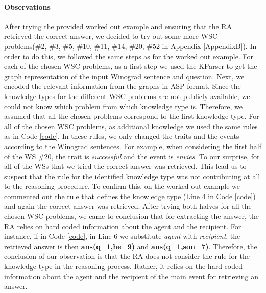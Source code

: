 \paragraph{Observations}
After trying the provided worked out example and ensuring that the RA retrieved the correct answer, we decided to try out some more WSC problems(\#2, \#3, \#5, \#10, \#11, \#14, \#20, \#52 in Appendix \ref{AppendixB}).
In order to do this, we followed the same steps as for the worked out example. For each of the chosen WSC problems, as a first step we used the KParser to get the graph representation of the input Winograd sentence and question. Next, we encoded the relevant information from the graphs in ASP format. Since the knowledge types for the different WSC problems are not publicly available, we could not know which problem from which knowledge type is. Therefore, we assumed that all the chosen problems correspond to the first knowledge type. For all of the chosen WSC problems, as additional knowledge we used the same rules as in Code \ref{code}. In these rules, we only changed the traits and the events according to the Winograd sentences. For example, when considering the first half of the WS \#20, the trait is \textit{successful} and the event is \textit{envies}. To our surprise, for all of the WSs that we tried the correct answer was retrieved. This lead us to suspect that the rule for the identified knowledge type was not contributing at all to the reasoning procedure. 
To confirm this, on the worked out example we commented out the rule that defines the knowledge type (Line 4 in Code \ref{code}) and again the correct answer was retrieved. After trying both halves for all the chosen WSC problems, we came to conclusion that for extracting the answer, the RA relies on hard coded information about the agent and the recipient. For instance, if in Code \ref{code}, in Line 6 we substitute \textit{agent} with \textit{recipient}, the retrieved answer is then \textbf{ans(q\_1,he\_9)} and \textbf{ans(q\_1,son\_7)}.
Therefore, the conclusion of our observation is that the RA does not consider the rule for the knowledge type in the reasoning process. Rather, it relies on the hard coded information about the agent and the recipient of the main event for retrieving an answer. 


